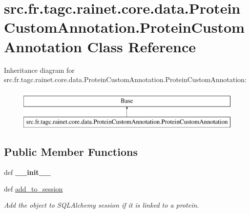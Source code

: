 \hypertarget{classsrc_1_1fr_1_1tagc_1_1rainet_1_1core_1_1data_1_1ProteinCustomAnnotation_1_1ProteinCustomAnnotation}{\section{src.\-fr.\-tagc.\-rainet.\-core.\-data.\-Protein\-Custom\-Annotation.\-Protein\-Custom\-Annotation Class Reference}
\label{classsrc_1_1fr_1_1tagc_1_1rainet_1_1core_1_1data_1_1ProteinCustomAnnotation_1_1ProteinCustomAnnotation}
}
Inheritance diagram for src.\-fr.\-tagc.\-rainet.\-core.\-data.\-Protein\-Custom\-Annotation.\-Protein\-Custom\-Annotation\-:\begin{figure}[H]
\begin{center}
\leavevmode
\includegraphics[height=2.000000cm]{classsrc_1_1fr_1_1tagc_1_1rainet_1_1core_1_1data_1_1ProteinCustomAnnotation_1_1ProteinCustomAnnotation}
\end{center}
\end{figure}
\subsection*{Public Member Functions}
\begin{DoxyCompactItemize}
\item 
\hypertarget{classsrc_1_1fr_1_1tagc_1_1rainet_1_1core_1_1data_1_1ProteinCustomAnnotation_1_1ProteinCustomAnnotation_a9a4c3835094311f53df695a45ed03dc4}{def {\bfseries \-\_\-\-\_\-init\-\_\-\-\_\-}}\label{classsrc_1_1fr_1_1tagc_1_1rainet_1_1core_1_1data_1_1ProteinCustomAnnotation_1_1ProteinCustomAnnotation_a9a4c3835094311f53df695a45ed03dc4}

\item 
\hypertarget{classsrc_1_1fr_1_1tagc_1_1rainet_1_1core_1_1data_1_1ProteinCustomAnnotation_1_1ProteinCustomAnnotation_a6ea05421320cc0a18e16034b15693664}{def \hyperlink{classsrc_1_1fr_1_1tagc_1_1rainet_1_1core_1_1data_1_1ProteinCustomAnnotation_1_1ProteinCustomAnnotation_a6ea05421320cc0a18e16034b15693664}{add\-\_\-to\-\_\-session}}\label{classsrc_1_1fr_1_1tagc_1_1rainet_1_1core_1_1data_1_1ProteinCustomAnnotation_1_1ProteinCustomAnnotation_a6ea05421320cc0a18e16034b15693664}

\begin{DoxyCompactList}\small\item\em Add the object to S\-Q\-L\-Alchemy session if it is linked to a protein. \end{DoxyCompactList}\end{DoxyCompactItemize}
